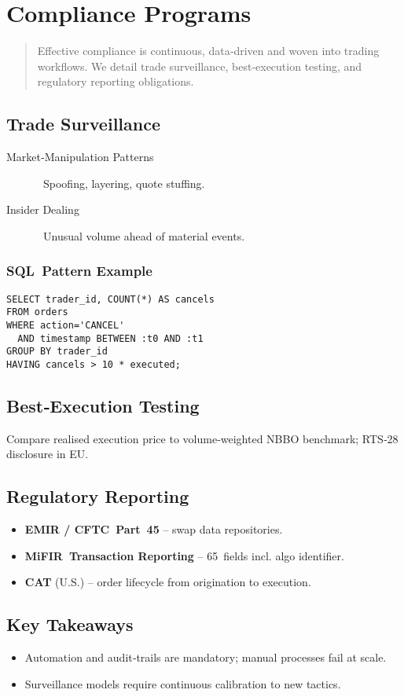 \chapter{Compliance Programs}\label{ch:compliance}

\begin{abstract}
Effective compliance is continuous, data‑driven and woven into trading
workflows.  We detail trade surveillance, best‑execution testing, and
regulatory reporting obligations.
\end{abstract}

\section{Trade Surveillance}

\begin{description}
  \item[Market‑Manipulation Patterns] Spoofing, layering, quote stuffing.
  \item[Insider Dealing] Unusual volume ahead of material events.
\end{description}

\subsection*{SQL Pattern Example}

\begin{verbatim}
SELECT trader_id, COUNT(*) AS cancels
FROM orders
WHERE action='CANCEL'
  AND timestamp BETWEEN :t0 AND :t1
GROUP BY trader_id
HAVING cancels > 10 * executed;
\end{verbatim}

\section{Best‑Execution Testing}

Compare realised execution price to volume‑weighted NBBO benchmark;
RTS‑28 disclosure in EU.

\section{Regulatory Reporting}

\begin{itemize}
  \item \textbf{EMIR / CFTC Part 45} – swap data repositories.
  \item \textbf{MiFIR Transaction Reporting} – 65 fields incl. algo
        identifier.
  \item \textbf{CAT} (U.S.) – order lifecycle from origination to execution.
\end{itemize}

\section*{Key Takeaways}

\begin{itemize}
  \item Automation and audit‑trails are mandatory; manual processes fail
        at scale.
  \item Surveillance models require continuous calibration to new tactics.
\end{itemize}
